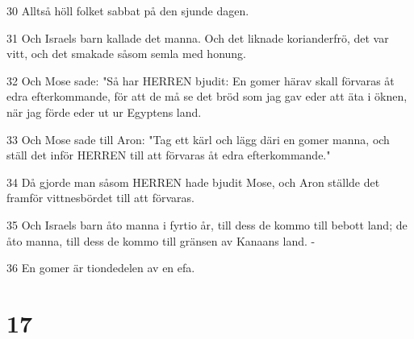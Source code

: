 \par 30 Alltså höll folket sabbat på den sjunde dagen.
\par 31 Och Israels barn kallade det manna. Och det liknade korianderfrö, det var vitt, och det smakade såsom semla med honung.
\par 32 Och Mose sade: "Så har HERREN bjudit: En gomer härav skall förvaras åt edra efterkommande, för att de må se det bröd som jag gav eder att äta i öknen, när jag förde eder ut ur Egyptens land.
\par 33 Och Mose sade till Aron: "Tag ett kärl och lägg däri en gomer manna, och ställ det inför HERREN till att förvaras åt edra efterkommande."
\par 34 Då gjorde man såsom HERREN hade bjudit Mose, och Aron ställde det framför vittnesbördet till att förvaras.
\par 35 Och Israels barn åto manna i fyrtio år, till dess de kommo till bebott land; de åto manna, till dess de kommo till gränsen av Kanaans land. -
\par 36 En gomer är tiondedelen av en efa.

\chapter{17}

